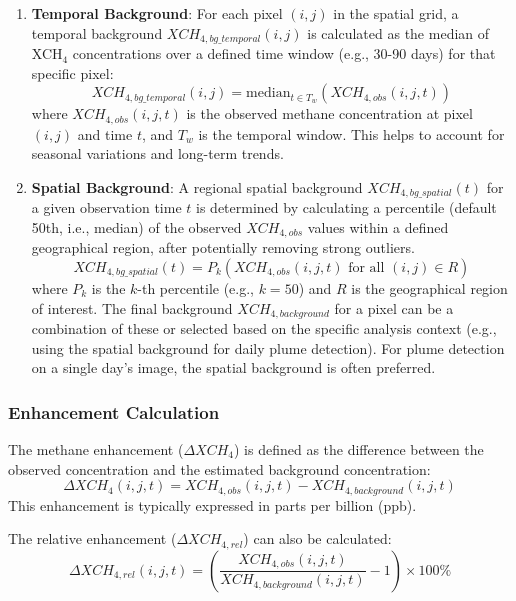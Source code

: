 \documentclass[12pt,a4paper]{article}
\begin{document}
\begin{enumerate}
    \item \textbf{Temporal Background}: For each pixel $(i,j)$ in the spatial grid, a temporal background $XCH_{4,bg\_temporal}(i,j)$ is calculated as the median of XCH$_4$ concentrations over a defined time window (e.g., 30-90 days) for that specific pixel:
    \begin{equation}
        XCH_{4,bg\_temporal}(i,j) = \text{median}_{t \in T_w} (XCH_{4,obs}(i,j,t))
        \label{eq:temporal_bg}
    \end{equation}
    where $XCH_{4,obs}(i,j,t)$ is the observed methane concentration at pixel $(i,j)$ and time $t$, and $T_w$ is the temporal window. This helps to account for seasonal variations and long-term trends.

    \item \textbf{Spatial Background}: A regional spatial background $XCH_{4,bg\_spatial}(t)$ for a given observation time $t$ is determined by calculating a percentile (default 50th, i.e., median) of the observed $XCH_{4,obs}$ values within a defined geographical region, after potentially removing strong outliers.
    \begin{equation}
        XCH_{4,bg\_spatial}(t) = P_k (XCH_{4,obs}(i,j,t) \text{ for all } (i,j) \in R)
        \label{eq:spatial_bg}
    \end{equation}
    where $P_k$ is the $k$-th percentile (e.g., $k=50$) and $R$ is the geographical region of interest.
    The final background $XCH_{4,background}$ for a pixel can be a combination of these or selected based on the specific analysis context (e.g., using the spatial background for daily plume detection). For plume detection on a single day's image, the spatial background is often preferred.
\end{enumerate}

\subsubsection{Enhancement Calculation}
The methane enhancement ($\Delta XCH_4$) is defined as the difference between the observed concentration and the estimated background concentration:
\begin{equation}
    \Delta XCH_4(i,j,t) = XCH_{4,obs}(i,j,t) - XCH_{4,background}(i,j,t)
    \label{eq:enhancement}
\end{equation}
This enhancement is typically expressed in parts per billion (ppb).

The relative enhancement ($\Delta XCH_{4,rel}$) can also be calculated:
\begin{equation}
    \Delta XCH_{4,rel}(i,j,t) = \left( \frac{XCH_{4,obs}(i,j,t)}{XCH_{4,background}(i,j,t)} - 1 \right) \times 100\%
    \label{eq:rel_enhancement}
\end{equation}
\end{document}
